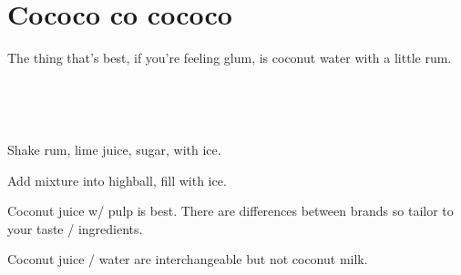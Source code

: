 \section[Cococo co cococo]{
    Cococo co cococo
}

\begin{recipestats}[
        servings=1,
        preptime=5 \minute,
        source=Mike \& Jane,
    ]
\end{recipestats}

\begin{recipeabstract}
    The thing that's best, if you're feeling glum, is coconut water with a little rum.
\end{recipeabstract}

\begin{ingredientcolumns}
    \begin{ingredientblock}
        \\
    \end{ingredientblock}
    \begin{ingredientblock}
        \\
    \end{ingredientblock}
\end{ingredientcolumns}

\begin{preparation}
\item Shake rum, lime juice, sugar, with ice.
\item Add mixture into highball, fill with ice.
\end{preparation}

\begin{variation}
\item Coconut juice w/ pulp is best.
    There are differences between brands so tailor to your taste / ingredients.

\item Coconut juice / water are interchangeable but not coconut milk.
\end{variation}

\recipeend
